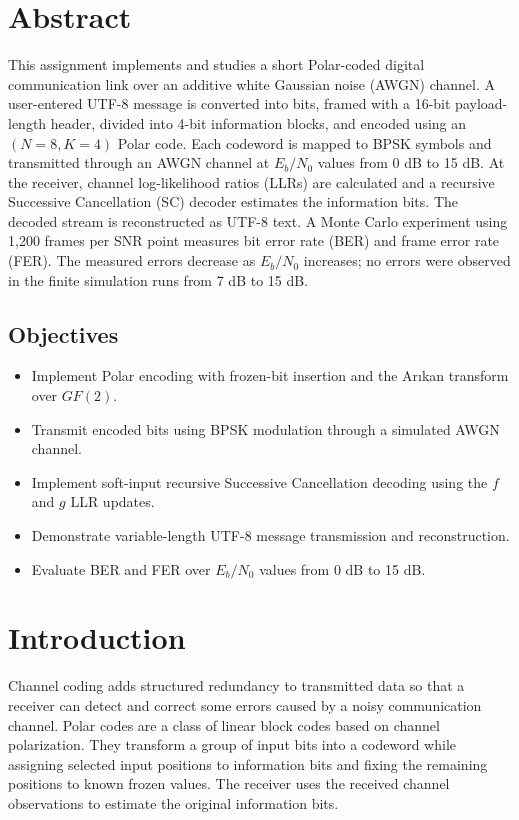 \documentclass[12pt,a4paper]{article}
\begin{document}
\hypersetup{pageanchor=true}
\tableofcontents
\clearpage
\listoffigures
\clearpage
{}

\section*{Abstract}
This assignment implements and studies a short Polar-coded digital communication link over an additive white Gaussian noise (AWGN) channel. A user-entered UTF-8 message is converted into bits, framed with a 16-bit payload-length header, divided into 4-bit information blocks, and encoded using an $(N=8,K=4)$ Polar code. Each codeword is mapped to BPSK symbols and transmitted through an AWGN channel at $E_b/N_0$ values from 0 dB to 15 dB. At the receiver, channel log-likelihood ratios (LLRs) are calculated and a recursive Successive Cancellation (SC) decoder estimates the information bits. The decoded stream is reconstructed as UTF-8 text. A Monte Carlo experiment using 1,200 frames per SNR point measures bit error rate (BER) and frame error rate (FER). The measured errors decrease as $E_b/N_0$ increases; no errors were observed in the finite simulation runs from 7 dB to 15 dB.

\subsection*{Objectives}
\begin{itemize}
  \item Implement Polar encoding with frozen-bit insertion and the Ar\i kan transform over $GF(2)$.
  \item Transmit encoded bits using BPSK modulation through a simulated AWGN channel.
  \item Implement soft-input recursive Successive Cancellation decoding using the $f$ and $g$ LLR updates.
  \item Demonstrate variable-length UTF-8 message transmission and reconstruction.
  \item Evaluate BER and FER over $E_b/N_0$ values from 0 dB to 15 dB.
\end{itemize}

\section{Introduction}
Channel coding adds structured redundancy to transmitted data so that a receiver can detect and correct some errors caused by a noisy communication channel. Polar codes are a class of linear block codes based on channel polarization. They transform a group of input bits into a codeword while assigning selected input positions to information bits and fixing the remaining positions to known frozen values. The receiver uses the received channel observations to estimate the original information bits.
\end{document}
